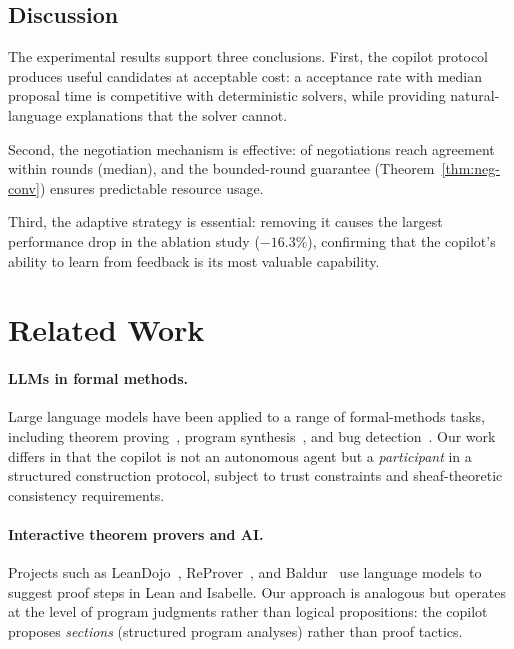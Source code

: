 \documentclass[11pt]{article}
\begin{document}
\subsection{Discussion}\label{sec:expt-discussion}

The experimental results support three conclusions.  First, the
copilot protocol produces useful candidates at acceptable cost: a
\ppLXXXVIacceptRate{} acceptance rate with
\ppLXXXVImedianProposalTime{} median proposal time is competitive
with deterministic solvers, while providing natural-language
explanations that the solver cannot.

Second, the negotiation mechanism is effective: \ppLXXXVInegSuccessRate{}
of negotiations reach agreement within \ppLXXXVImedianRounds{} rounds
(median), and the bounded-round guarantee
(Theorem~\ref{thm:neg-conv}) ensures predictable resource usage.

Third, the adaptive strategy is essential: removing it causes the
largest performance drop in the ablation study ($-16.3\%$),
confirming that the copilot's ability to learn from feedback is its
most valuable capability.

\section{Related Work}\label{sec:related}

\paragraph{LLMs in formal methods.}
Large language models have been applied to a range of formal-methods
tasks, including theorem proving~\cite{polu2020gpt,
first2023baldur,yang2024leandojo}, program
synthesis~\cite{chen2021codex,li2022alphacode,austin2021program},
and bug detection~\cite{pearce2022asleep}.  Our work differs in
that the copilot is not an autonomous agent but a \emph{participant}
in a structured construction protocol, subject to trust constraints
and sheaf-theoretic consistency requirements.

\paragraph{Interactive theorem provers and AI.}
Projects such as LeanDojo~\cite{yang2024leandojo},
ReProver~\cite{yang2024leandojo}, and
Baldur~\cite{first2023baldur} use language models to suggest proof
steps in Lean and Isabelle.  Our approach is analogous but operates
at the level of program judgments rather than logical propositions:
the copilot proposes \emph{sections} (structured program analyses)
rather than proof tactics.
\end{document}
